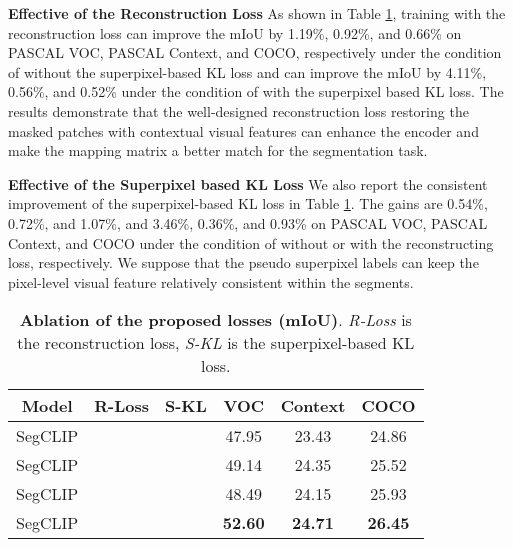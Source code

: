 \documentclass{article}
\theoremstyle{plain}
\theoremstyle{definition}
\theoremstyle{remark}
\newcommand{\cmark}{\ding{51}}\newcommand{\xmark}{\ding{55}}\usepackage{arydshln}
\begin{document}
\vspace{0.1cm}
\noindent
\textbf{Effective of the Reconstruction Loss} \quad
 As shown in Table \ref{tab:result_of_ablation}, training with the reconstruction loss can improve the mIoU by 1.19\%, 0.92\%, and 0.66\% on PASCAL VOC, PASCAL Context, and COCO, respectively under the condition of without the superpixel-based KL loss and can improve the mIoU by 4.11\%, 0.56\%, and 0.52\% under the condition of with the superpixel based KL loss. The results demonstrate that the well-designed reconstruction loss restoring the masked patches with contextual visual features can enhance the encoder and make the mapping matrix a better match for the segmentation task.

 \vspace{0.1cm}
 \noindent
 \textbf{Effective of the Superpixel based KL Loss} \quad
We also report the consistent improvement of the superpixel-based KL loss in Table \ref{tab:result_of_ablation}. The gains are 0.54\%, 0.72\%, and 1.07\%, and 3.46\%, 0.36\%, and 0.93\% on PASCAL VOC, PASCAL Context, and COCO under the condition of without or with the reconstructing loss, respectively. We suppose that the pseudo superpixel labels can keep the pixel-level visual feature relatively consistent within the segments. 
\begin{table}[tp]
    \setlength{\tabcolsep}{5pt}
    \centering
    \begin{tabular}{cccccc}
        \toprule
        Model       & R-Loss & S-KL & VOC & Context & COCO \\ \midrule
        SegCLIP     &   &   & 47.95 & 23.43 & 24.86 \\
        SegCLIP     & \cmark &   & 49.14 & 24.35 & 25.52 \\
        SegCLIP     &   & \cmark  & 48.49 & 24.15 & 25.93 \\
        SegCLIP     & \cmark & \cmark & \textbf{52.60} & \textbf{24.71} & \textbf{26.45} \\
        \bottomrule
    \end{tabular}
    \caption{\textbf{Ablation of the proposed losses (mIoU)}. \emph{R-Loss} is the reconstruction loss, \emph{S-KL} is the superpixel-based KL loss.}
    \label{tab:result_of_ablation}
\end{table}
\end{document}
